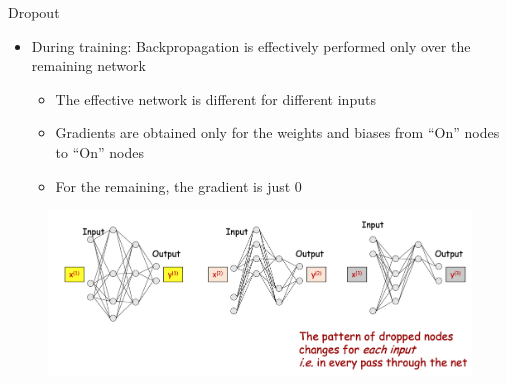\documentclass[serif, aspectratio=169]{beamer}
\begin{document}
\begin{frame}{Dropout}
	\begin{itemize}
		\item During training: Backpropagation is effectively performed only over the remaining network
		\begin{itemize}
			\item The effective network is different for different inputs
			\item Gradients are obtained only for the weights and biases from “On” nodes to “On” nodes
			\item For the remaining, the gradient is just 0
		\end{itemize}
	\end{itemize}
	
	\begin{figure}[htpb]
		\begin{center}
			\includegraphics[keepaspectratio, scale=0.23]{pic/dropout3}
		\end{center}
	\end{figure}
\end{frame}
\end{document}
